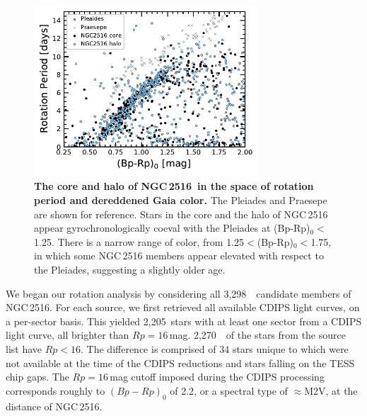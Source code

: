 \documentclass[12pt,twocolumn,tighten]{aastex63}
\newcommand{\cn}{NGC\,2516} %
\newcommand{\nkinematic}{3{,}298\ } %
\newcommand{\ncdips}{2{,}205\ }
\newcommand{\nkinematicrpltsixteen}{2{,}270\ }
\begin{document}
\begin{figure}[t]
	\begin{center}
		\leavevmode
    \includegraphics[width=0.75\textwidth]{f3a.pdf}
	
	\end{center}
	\vspace{-0.7cm}
	\caption{ {\bf The core and halo of \cn\ in the space of rotation
    period and dereddened Gaia color.}
    The Pleiades \citep[125\,Myr][]{rebull_rotation_2016a}
    and Praesepe \citep[650\,Myr][]{douglas_poking_2017}
    are shown for reference.
    Stars in the core and the halo of NGC\,2516 appear
    gyrochronologically coeval with the Pleiades at (Bp-Rp)$_0$$<$1.25.
    There is a narrow range of color, from 1.25$<$(Bp-Rp)$_0$$<$1.75,
    in which some NGC\,2516 members appear elevated with respect to
    the Pleiades, suggesting a slightly older age.
		\label{fig:rot}
	}
\end{figure}

We began our rotation analysis by considering all \nkinematic\
candidate members of \cn.  For each source, we first retrieved all
available CDIPS light curves, on a per-sector basis.  This yielded
\ncdips stars with at least one sector from a CDIPS light curve, all
brighter than $Rp=16$\,mag.  \nkinematicrpltsixteen\ of the
stars from the source list have $Rp<16$.  The difference is comprised
of 34 stars unique to \citet{meingast_2021} which were not
available at the time of the CDIPS reductions and stars falling on
the TESS chip gaps.  The $Rp=16$\,mag cutoff imposed during the CDIPS
processing corresponds roughly to $(Bp-Rp)_0$ of 2.2, or a spectral
type of $\approx$M2V, at the distance of NGC\,2516.
\end{document}
